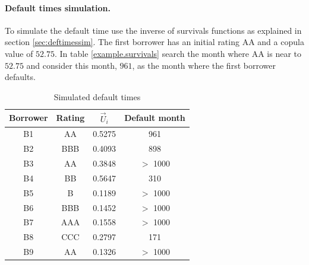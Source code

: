 \documentclass[a4paper,12pt,final]{article}
\begin{document}
\paragraph{Default times simulation.} To simulate the default time use the 
inverse of survivals functions as explained in section \ref{sec:deftimessim}.
The first borrower has an initial rating AA and a copula value of $52.75$. 
In table \ref{example.survivals} search the month where AA is near to 
$52.75$ and consider this month, $961$, as the month where the first borrower 
defaults. 
{\small
\begin{table}[!hbt]
\begin{center}
\begin{tabular}[]{|c|c|c|c|}
Borrower & Rating & $\vec{U}_i$ & Default month \\
\hline
B1       & AA     &  0.5275     &  961      \\
B2       & BBB    &  0.4093     &  898      \\
B3       & AA     &  0.3848     &  $>$ 1000 \\
B4       & BB     &  0.5647     &  310      \\
B5       & B      &  0.1189     &  $>$ 1000 \\
B6       & BBB    &  0.1452     &  $>$ 1000 \\
B7       & AAA    &  0.1558     &  $>$ 1000 \\
B8       & CCC    &  0.2797     &  171      \\
B9       & AA     &  0.1326     &  $>$ 1000 \\
\end{tabular}
\caption{Simulated default times}
\end{center}
\end{table}
}
\FloatBarrier
\end{document}
